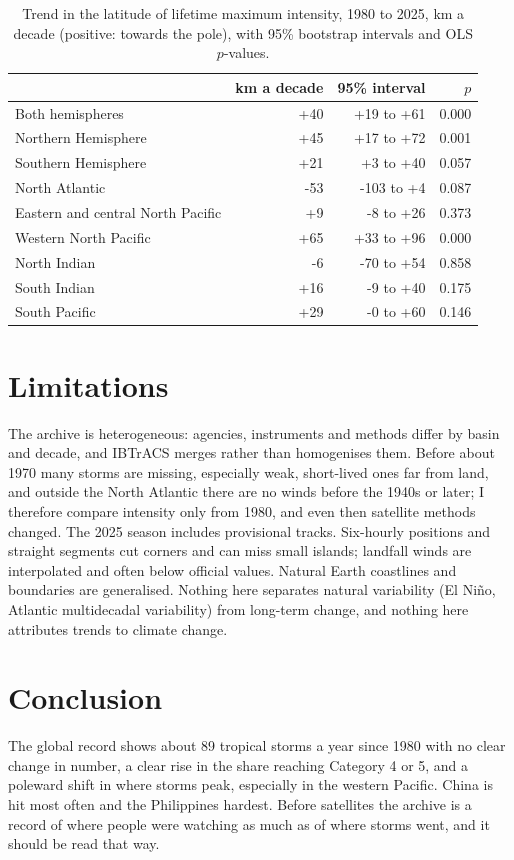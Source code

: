 \documentclass[11pt,a4paper]{article}
\begin{document}
\begin{table}[tbp]\centering\small\caption{Trend in the latitude of lifetime maximum intensity, 1980 to 2025, km a decade (positive: towards the pole), with 95\% bootstrap intervals and OLS $p$-values.}\label{tab:lmi}\begin{tabular}{lrrr}\toprule & km a decade & 95\% interval & $p$\\\midrule
Both hemispheres & +40 & +19 to +61 & 0.000\\
Northern Hemisphere & +45 & +17 to +72 & 0.001\\
Southern Hemisphere & +21 & +3 to +40 & 0.057\\
North Atlantic & -53 & -103 to +4 & 0.087\\
Eastern and central North Pacific & +9 & -8 to +26 & 0.373\\
Western North Pacific & +65 & +33 to +96 & 0.000\\
North Indian & -6 & -70 to +54 & 0.858\\
South Indian & +16 & -9 to +40 & 0.175\\
South Pacific & +29 & -0 to +60 & 0.146\\
\bottomrule\end{tabular}\end{table}

\section{Limitations}
The archive is heterogeneous: agencies, instruments and methods differ by basin and decade, and IBTrACS merges rather than homogenises them. Before about 1970 many storms are missing, especially weak, short-lived ones far from land, and outside the North Atlantic there are no winds before the 1940s or later; I therefore compare intensity only from 1980, and even then satellite methods changed. The 2025 season includes provisional tracks. Six-hourly positions and straight segments cut corners and can miss small islands; landfall winds are interpolated and often below official values. Natural Earth coastlines and boundaries are generalised. Nothing here separates natural variability (El Ni\~no, Atlantic multidecadal variability) from long-term change, and nothing here attributes trends to climate change.

\section{Conclusion}
The global record shows about 89 tropical storms a year since 1980 with no clear change in number, a clear rise in the share reaching Category 4 or 5, and a poleward shift in where storms peak, especially in the western Pacific. China is hit most often and the Philippines hardest. Before satellites the archive is a record of where people were watching as much as of where storms went, and it should be read that way.
\end{document}
